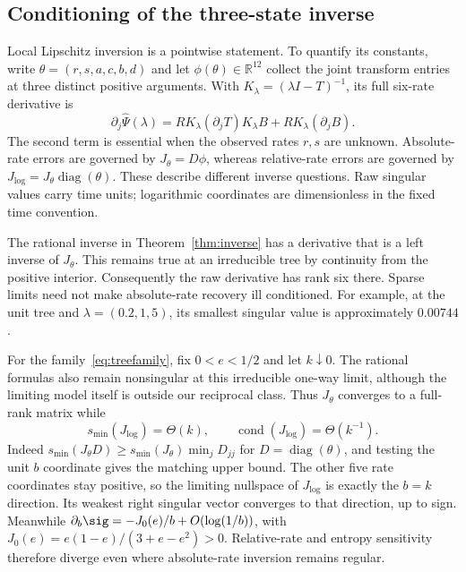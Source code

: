 \subsection{Conditioning of the three-state inverse}\label{subsec:conditioning}

Local Lipschitz inversion is a pointwise statement. To quantify its constants,
write $\theta=(r,s,a,c,b,d)$ and let $\phi(\theta)\in\mathbb R^{12}$ collect
the joint transform entries at three distinct positive arguments. With
$K_\lambda=(\lambda I-T)^{-1}$, its full six-rate derivative is
\begin{equation}
 \partial_j\widehat\Psi(\lambda)
 =RK_\lambda(\partial_jT)K_\lambda B
   +RK_\lambda(\partial_jB).\label{eq:transform-jacobian}
\end{equation}
The second term is essential when the observed rates $r,s$ are unknown.
Absolute-rate errors are governed by $J_\theta=D\phi$, whereas relative-rate
errors are governed by $J_{\log}=J_\theta\operatorname{diag}(\theta)$.
These describe different inverse questions. Raw singular values carry time
units; logarithmic coordinates are dimensionless in the fixed time convention.

The rational inverse in Theorem~\ref{thm:inverse} has a derivative that is a
left inverse of $J_\theta$. This remains true at an irreducible tree by
continuity from the positive interior. Consequently the raw derivative has
rank six there. Sparse limits need not make absolute-rate recovery ill
conditioned. For example, at the unit tree and $\lambda=(0.2,1,5)$, its smallest
singular value is approximately $0.00744$.

For the family~\eqref{eq:treefamily}, fix $0<e<1/2$ and let $k\downarrow0$.
The rational formulas also remain nonsingular at this irreducible one-way
limit, although the limiting model itself is outside our reciprocal class.
Thus $J_\theta$ converges to a full-rank matrix while
\begin{equation}
 s_{\min}(J_{\log})=\Theta(k),\qquad
 \operatorname{cond}(J_{\log})=\Theta(k^{-1}).\label{eq:log-conditioning}
\end{equation}
Indeed $s_{\min}(J_\theta D)\ge s_{\min}(J_\theta)\min_jD_{jj}$ for
$D=\operatorname{diag}(\theta)$, and testing the unit $b$ coordinate gives
the matching upper bound. The other five rate coordinates stay positive,
so the limiting nullspace of $J_{\log}$ is exactly the $b=k$ direction.
Its weakest right singular vector converges to that direction, up to sign.
Meanwhile $\partial_b\sig=-J_0(e)/b+O(\log(1/b))$, with
$J_0(e)=e(1-e)/(3+e-e^2)>0$. Relative-rate and entropy sensitivity therefore
diverge even where absolute-rate inversion remains regular.

